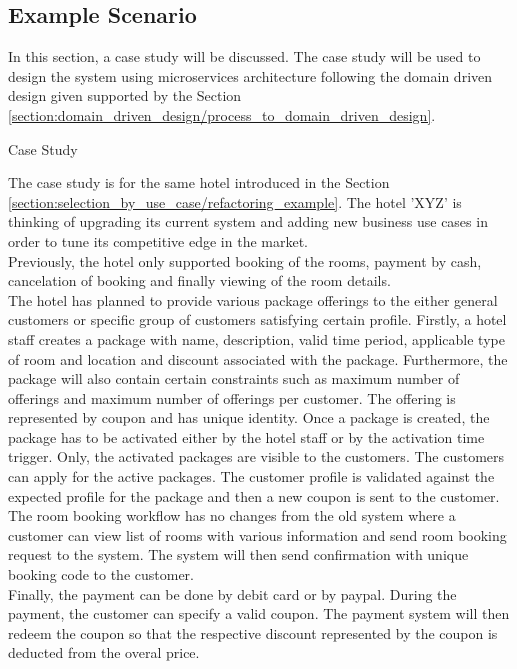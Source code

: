 \subsection{Example Scenario}\label{section:domain_driven_design/example_scenario}
In this section, a case study will be discussed. The case study will be used to design the system using microservices architecture following the domain driven design given supported by the Section \ref{section:domain_driven_design/process_to_domain_driven_design}.

\begin{shaded} Case Study \end{shaded} \label{section:domain_driven_design/example_scenario/case_study}
The case study is for the same hotel introduced in the Section \ref{section:selection_by_use_case/refactoring_example}. The hotel 'XYZ' is thinking of upgrading its current system and adding new business use cases in order to tune its competitive edge in the market.\\
Previously, the hotel only supported booking of the rooms, payment by cash, cancelation of booking and finally viewing of the room details.\\
The hotel has planned to provide various package offerings to the either general customers or specific group of customers satisfying certain profile. Firstly, a hotel staff creates a package with name, description, valid time period, applicable type of room and location and discount associated with the package. Furthermore, the package will also contain certain constraints such as maximum number of offerings and maximum number of offerings per customer. The offering is represented by coupon and has unique identity. Once a package is created, the package has to be activated either by the hotel staff or by the activation time trigger. Only, the activated packages are visible to the customers. The customers can apply for the active packages. The customer profile is validated against the expected profile for the package and then a new coupon is sent to the customer.\\
The room booking workflow has no changes from the old system where a customer can view list of rooms with various information and send room booking request to the system. The system will then send confirmation with unique booking code to the customer.\\
Finally, the payment can be done by debit card or by paypal. During the payment, the customer can specify a valid coupon. The payment system will then redeem the coupon so that the respective discount represented by the coupon is deducted from the overal price.\\
